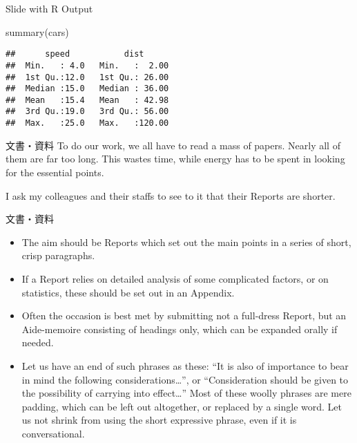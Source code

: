 \documentclass[
  ignorenonframetext,
]{beamer}
\newenvironment{Shaded}{\begin{snugshade}}{\end{snugshade}}
\newcommand{\FunctionTok}[1]{\textcolor[rgb]{0.00,0.00,0.00}{#1}}
\newcommand{\NormalTok}[1]{#1}
\providecommand{\tightlist}{%
  \setlength{\itemsep}{0pt}\setlength{\parskip}{0pt}}
\let\oldShaded\Shaded
\let\endoldShaded\endShaded
\renewenvironment{Shaded}{\footnotesize\oldShaded}{\endoldShaded}
\begin{document}
\begin{frame}[fragile]{Slide with R Output}
\protect\hypertarget{slide-with-r-output}{}
\begin{Shaded}
\begin{Highlighting}[]
\FunctionTok{summary}\NormalTok{(cars)}
\end{Highlighting}
\end{Shaded}

\begin{verbatim}
##      speed           dist       
##  Min.   : 4.0   Min.   :  2.00  
##  1st Qu.:12.0   1st Qu.: 26.00  
##  Median :15.0   Median : 36.00  
##  Mean   :15.4   Mean   : 42.98  
##  3rd Qu.:19.0   3rd Qu.: 56.00  
##  Max.   :25.0   Max.   :120.00
\end{verbatim}
\end{frame}

\begin{frame}{文書・資料}
\protect\hypertarget{ux6587ux66f8ux8cc7ux6599}{}
To do our work, we all have to read a mass of papers. Nearly all of them
are far too long. This wastes time, while energy has to be spent in
looking for the essential points.

I ask my colleagues and their staffs to see to it that their Reports are
shorter.
\end{frame}

\begin{frame}{文書・資料}
\protect\hypertarget{ux6587ux66f8ux8cc7ux6599-1}{}
\begin{itemize}[<+->]
\tightlist
\item
  \textbullet{}\hspace{2pt} The aim should be Reports which set out the
  main points in a series of short, crisp paragraphs.
\item
  \textbullet{}\hspace{2pt} If a Report relies on detailed analysis of
  some complicated factors, or on statistics, these should be set out in
  an Appendix.
\item
  \textbullet{}\hspace{2pt} Often the occasion is best met by submitting
  not a full-dress Report, but an Aide-memoire consisting of headings
  only, which can be expanded orally if needed.
\item
  \textbullet\hspace{2pt}Let us have an end of such phrases as these:
  ``It is also of importance to bear in mind the following
  considerations\ldots{}'', or ``Consideration should be given to the
  possibility of carrying into effect\ldots{}'' Most of these woolly
  phrases are mere padding, which can be left out altogether, or
  replaced by a single word. Let us not shrink from using the short
  expressive phrase, even if it is conversational.
\end{itemize}
\end{frame}
\end{document}
